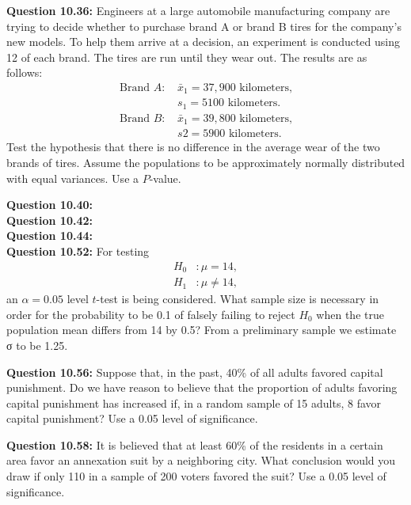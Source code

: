 \documentclass{article}
\begin{document}
\textbf{Question 10.36:}
Engineers at a large automobile manufacturing 
company are trying to decide whether to purchase
brand A or brand B tires for the company’s new models. 
To help them arrive at a decision, an experiment
is conducted using 12 of each brand. The tires are run
until they wear out. The results are as follows:
\begin{align*}
    \text{Brand }A \text{: }& \bar{x}_1 = 37,900 \text{ kilometers,}\\
    &s_1 = 5100 \text{ kilometers.}\\
    \text{Brand }B \text{: }& \bar{x}_1 = 39,800 \text{ kilometers,}\\
    &s 2 = 5900 \text{ kilometers.}
\end{align*}
Test the hypothesis that there is no difference in the
average wear of the two brands of tires. Assume the
populations to be approximately normally distributed
with equal variances. Use a $P$-value.
\newline

\textbf{Question 10.40:}
\\
\textbf{Question 10.42:}
\\
\textbf{Question 10.44:}
\\
\textbf{Question 10.52:}
For testing
\begin{align*}
    H_0 &: \mu = 14,\\
    H_1 &: \mu \not= 14,
\end{align*}
an $\alpha = 0.05$ level $t$-test is being considered. What 
sample size is necessary in order for the probability to be
0.1 of falsely failing to reject $H_0$ when the true 
population mean differs from 14 by 0.5? From a preliminary
sample we estimate σ to be 1.25.
\newline

\textbf{Question 10.56:}
Suppose that, in the past, 40\% of all adults
favored capital punishment. Do we have reason to
believe that the proportion of adults favoring capital
punishment has increased if, in a random sample of 15
adults, 8 favor capital punishment? Use a 0.05 level of
significance.
\newline

\textbf{Question 10.58:}
It is believed that at least 60\% of the residents
in a certain area favor an annexation suit by a 
neighboring city. What conclusion would you draw if only
110 in a sample of 200 voters favored the suit? Use a
0.05 level of significance.
\newline
\end{document}

